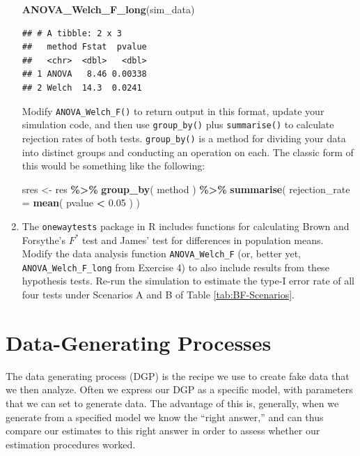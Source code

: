 \documentclass[
]{book}
\newenvironment{Shaded}{\begin{snugshade}}{\end{snugshade}}
\newcommand{\AttributeTok}[1]{\textcolor[rgb]{0.13,0.29,0.53}{#1}}
\newcommand{\FloatTok}[1]{\textcolor[rgb]{0.00,0.00,0.81}{#1}}
\newcommand{\FunctionTok}[1]{\textcolor[rgb]{0.13,0.29,0.53}{\textbf{#1}}}
\newcommand{\NormalTok}[1]{#1}
\newcommand{\OtherTok}[1]{\textcolor[rgb]{0.56,0.35,0.01}{#1}}
\newcommand{\SpecialCharTok}[1]{\textcolor[rgb]{0.81,0.36,0.00}{\textbf{#1}}}
\begin{document}
\begin{enumerate}
\begin{Shaded}
\begin{Highlighting}[]
\FunctionTok{ANOVA\_Welch\_F\_long}\NormalTok{(sim\_data)}
\end{Highlighting}
\end{Shaded}

\begin{verbatim}
## # A tibble: 2 x 3
##   method Fstat  pvalue
##   <chr>  <dbl>   <dbl>
## 1 ANOVA   8.46 0.00338
## 2 Welch  14.3  0.0241
\end{verbatim}

  Modify \texttt{ANOVA\_Welch\_F()} to return output in this format, update your simulation code, and then use \texttt{group\_by()} plus \texttt{summarise()} to calculate rejection rates of both tests.
  \texttt{group\_by()} is a method for dividing your data into distinct groups and conducting an operation on each.
  The classic form of this would be something like the following:

\begin{Shaded}
\begin{Highlighting}[]
\NormalTok{sres }\OtherTok{\textless{}{-}} 
\NormalTok{  res }\SpecialCharTok{\%\textgreater{}\%} 
  \FunctionTok{group\_by}\NormalTok{( method ) }\SpecialCharTok{\%\textgreater{}\%}
  \FunctionTok{summarise}\NormalTok{( }\AttributeTok{rejection\_rate =} \FunctionTok{mean}\NormalTok{( pvalue }\SpecialCharTok{\textless{}} \FloatTok{0.05}\NormalTok{ ) )}
\end{Highlighting}
\end{Shaded}
\item
  The \texttt{onewaytests} package in R includes functions for calculating Brown and Forsythe's \(F^*\) test and James' test for differences in population means. Modify the data analysis function \texttt{ANOVA\_Welch\_F} (or, better yet, \texttt{ANOVA\_Welch\_F\_long} from Exercise 4) to also include results from these hypothesis tests. Re-run the simulation to estimate the type-I error rate of all four tests under Scenarios A and B of Table \ref{tab:BF-Scenarios}.
\end{enumerate}

\chapter{Data-Generating Processes}\label{data-generating-processes}

The data generating process (DGP) is the recipe we use to create fake data that we then analyze.
Often we express our DGP as a specific model, with parameters that we can set to generate data.
The advantage of this is, generally, when we generate from a specified model we know the ``right answer,'' and can thus compare our estimates to this right answer in order to assess whether our estimation procedures worked.
\end{document}

